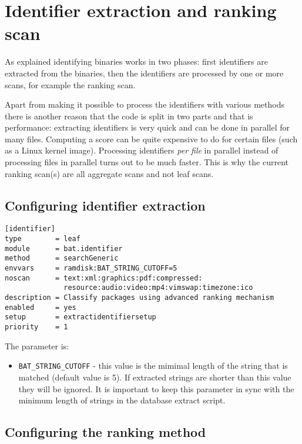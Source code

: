 \documentclass[10pt,a4paper]{article}
\begin{document}
\section{Identifier extraction and ranking scan}

As explained identifying binaries works in two phases: first identifiers are
extracted from the binaries, then the identifiers are processed by one or more
scans, for example the ranking scan.

Apart from making it possible to process the identifiers with various methods
there is another reason that the code is split in two parts and that is
performance: extracting identifiers is very quick and can be done in parallel
for many files. Computing a score can be quite expensive to do for certain
files (such as a Linux kernel image). Processing identifiers \textit{per file}
in parallel instead of processing files in parallel turns out to be much faster.
This is why the current ranking scan(s) are all aggregate scans and not leaf
scans.

\subsection{Configuring identifier extraction}

\begin{verbatim}
[identifier]
type        = leaf
module      = bat.identifier
method      = searchGeneric
envvars     = ramdisk:BAT_STRING_CUTOFF=5
noscan      = text:xml:graphics:pdf:compressed:
              resource:audio:video:mp4:vimswap:timezone:ico
description = Classify packages using advanced ranking mechanism
enabled     = yes
setup       = extractidentifiersetup
priority    = 1
\end{verbatim}

The parameter is:

\begin{itemize}
\item \texttt{BAT\_STRING\_CUTOFF} - this value is the mimimal length of the
string that is matched (default value is 5). If extracted strings are shorter
than this value they will be ignored. It is important to keep this parameter in
sync with the minimum length of strings in the database extract script.
\end{itemize}

\subsection{Configuring the ranking method}
\end{document}
